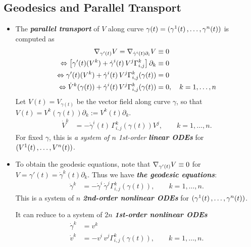 \documentclass[11pt]{article}
\begin{document}
\subsection{Geodesics and Parallel Transport}
\begin{itemize}
\item The \emph{\textbf{parallel transport}} of $V$ along curve $\gamma(t) = (\gamma^1(t) \,{,}\ldots{,}\, \gamma^n(t))$ is computed as
\begin{align*}
\nabla_{\gamma'(t)}{V} = \nabla_{\dot{\gamma}^i(t)\partial_i}{V} &\equiv 0\\
\Leftrightarrow \left[\gamma'(t)(V^k) + \dot{\gamma}^i(t)\,V^j \Gamma_{i,j}^k\right] \partial_k& \equiv 0 \\
\Leftrightarrow \gamma'(t)(V^k) + \dot{\gamma}^i(t)\,V^j \Gamma_{i,j}^k(\gamma(t)) &= 0 \\
\Leftrightarrow \dot{V}^k(\gamma(t)) + \dot{\gamma}^i(t)\,V^j \Gamma_{i,j}^k(\gamma(t)) &= 0, \quad k=1,\ldots, n
\end{align*} Let $V(t) = V_{\gamma(t)}$ be the vector field along curve $\gamma$, so that $V(t) = V^{k}(\gamma(t)) \partial_k := V^k(t) \partial_k$.
\begin{align}
\dot{V}^k &= -\dot{\gamma}^i(t)\, \Gamma_{i,j}^k(\gamma(t))V^j, \quad \quad k=1,\ldots, n. \label{eqn: parallel_transport}
\end{align} For fixed $\gamma$, this is \emph{a system of $n$ 1st-order \textbf{linear ODEs}} for $(V^1(t) \,{,}\ldots{,}\, V^{n}(t))$.

\item To obtain the geodesic equations, note that $\nabla_{\gamma'(t)}{V} \equiv 0$ for $V= \gamma'(t) = \dot{\gamma}^k(t)\partial_k$. Thus we have \emph{\textbf{the geodesic equations}}:
\begin{align}
\ddot{\gamma}^k &= -\dot{\gamma}^i\,\dot{\gamma}^j \Gamma_{i,j}^k(\gamma(t)), \quad \quad k=1,\ldots, n. \label{eqn: geodesic_equations}
\end{align} This is a system of $n$ \emph{\textbf{2nd-order nonlinear ODEs}} for $(\gamma^1(t) \,{,}\ldots{,}\, \gamma^n(t))$.

It can reduce to a system of $2n$ \emph{\textbf{1st-order nonlinear ODEs}}
\begin{align}
\dot{\gamma}^k &= v^k  \nonumber\\
\dot{v}^k &= -v^i\,v^j \Gamma_{i,j}^k(\gamma(t)), \quad \quad k=1,\ldots, n. \label{eqn: geodesic_equations_1st_order}
\end{align} 
\end{itemize}
\end{document}
